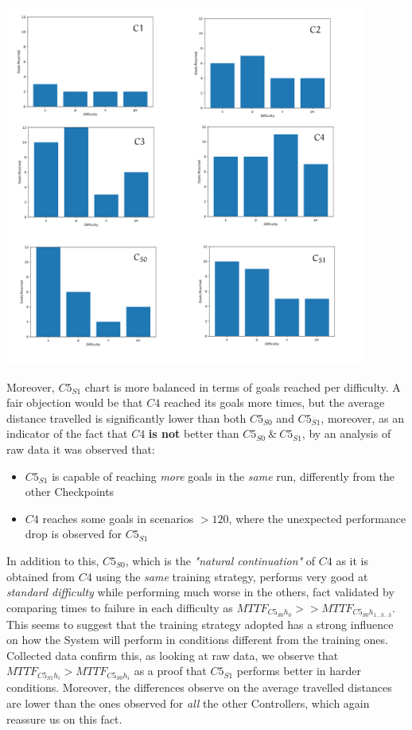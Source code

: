\begin{minipage}[c]{450px}
	\includegraphics[width=450px,height=450px]{img/goals.png}
\end{minipage}
\newpage

Moreover, $C5_{S1}$ chart is more balanced in terms of goals reached per difficulty. A fair objection would be that $C4$ reached its goals more times, but the average distance travelled is significantly lower than both $C5_{S0}$ and $C5_{S1}$, moreover, as an indicator of the fact that $C4$ \textbf{is not} better than $C5_{S0}\: \&\: C5_{S1}$, by an analysis of raw data it was observed that:

\begin{itemize}
	\item $C5_{S1}$ is capable of reaching \textsl{more} goals in the \textsl{same} run, differently from the other Checkpoints
	\item $C4$ reaches some goals in scenarios $> 120$, where the unexpected performance drop is observed for $C5_{S1}$
\end{itemize}

In addition to this, $C5_{S0}$, which is the \textsl{"natural continuation"} of $C4$ as it is obtained from $C4$ using the \textsl{same} training strategy, performs very good at \textsl{standard difficulty} while performing much worse in the others, fact validated by comparing times to failure in each difficulty as $MTTF_{C5_{S0}h_{0}} >> MTTF_{C5_{S0}h_{1\dots 3\dots 3}}$.
This seems to suggest that the training strategy adopted has a strong influence on how the System will perform in conditions different from the training ones. Collected data confirm this, as looking at raw data, we observe that $MTTF_{C5_{S1}h_{i}} > MTTF_{C5_{S0}h_{i}}$ as a proof that $C5_{S1}$ performs better in harder conditions. Moreover, the differences observe on the average travelled distances are lower than the ones observed for \textsl{all} the other Controllers, which again reassure us on this fact.\newline

